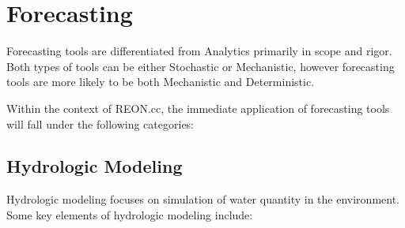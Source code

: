 \documentclass[letterpaper,10pt,english]{sphinxmanual}
\begin{document}
\section{Forecasting}
\label{\detokenize{requirements/knowledge/forecasting:forecasting}}\label{\detokenize{requirements/knowledge/forecasting::doc}}
\sphinxAtStartPar
Forecasting tools are differentiated from Analytics primarily in scope and
rigor. Both types of tools can be either Stochastic or Mechanistic, however
forecasting tools are more likely to be both Mechanistic and Deterministic.

\sphinxAtStartPar
Within the context of REON.cc, the immediate application of forecasting tools will fall under the following categories:


\subsection{Hydrologic Modeling}
\label{\detokenize{requirements/knowledge/hydrologic:hydrologic-modeling}}\label{\detokenize{requirements/knowledge/hydrologic::doc}}
\sphinxAtStartPar
Hydrologic modeling focuses on simulation of water quantity in the environment. Some key elements of hydrologic modeling include:
\end{document}
